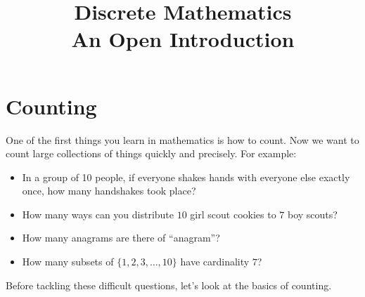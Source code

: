 \documentclass[10pt,]{book}
\title{Discrete Mathematics\\
{\large An Open Introduction}}
\author{}
\date{}
\theoremstyle{plain}
\theoremstyle{definition}
\theoremstyle{definition}
\theoremstyle{definition}
\numberwithin{equation}{section}
\begin{document}
\typeout{************************************************}
\typeout{************************************************}
\chapter[Counting]{Counting}\label{ch_counting}
\typeout{************************************************}
\typeout{************************************************}

One of the first things you learn in mathematics is how to count. Now we want to count large collections of things quickly and precisely. For example:
%
\leavevmode%
\begin{itemize}[label=\textbullet]
\item{}
In a group of 10 people, if everyone shakes hands with everyone else exactly once, how many handshakes took place?
%
\item{}
How many ways can you distribute \(10\) girl scout cookies to \(7\) boy scouts?
%
\item{}
How many anagrams are there of ``anagram''?
%
\item{}
How many subsets of \(\{1,2,3,\ldots, 10\}\) have cardinality \(7\)?
%
\end{itemize}
\par

Before tackling these difficult questions, let's look at the basics of counting.
%
\typeout{************************************************}
\typeout{************************************************}
\end{document}
